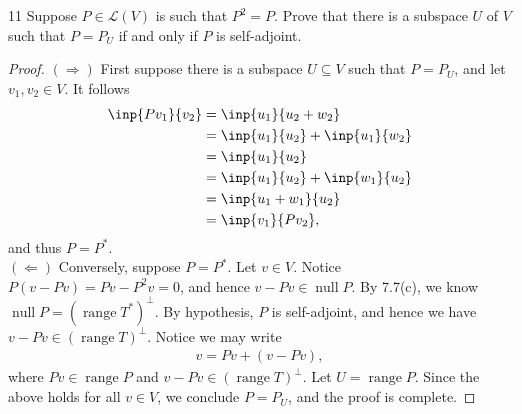 \documentclass{extarticle}
\newenvironment{problem}[1]{\begin{prob*}{#1}{}}{\end{prob*}}
\newcommand{\Hom}{\mathcal{L}}
\DeclareMathOperator{\Null}{null}
\DeclareMathOperator{\Range}{range}
\begin{document}
\begin{problem}{11}
Suppose $P\in\Hom(V)$ is such that $P^2 = P$.  Prove that there is a subspace $U$ of $V$ such that $P = P_U$ if and only if $P$ is self-adjoint.
\end{problem}
\begin{proof}
$(\Rightarrow)$ First suppose there is a subspace $U\subseteq V$ such that $P = P_U$, and let $v_1,v_2\in V$.  It follows
\begin{align*}
\inp{Pv_1}{v_2} &= \inp{u_1}{u_2 + w_2}\\
&= \inp{u_1}{u_2} + \inp{u_1}{w_2}\\
&= \inp{u_1}{u_2}\\
&= \inp{u_1}{u_2} + \inp{w_1}{u_2}\\
&= \inp{u_1 + w_1}{u_2}\\
&= \inp{v_1}{Pv_2},
\end{align*}
and thus $P = P^\ast$.\\
\indent $(\Leftarrow)$ Conversely, suppose $P = P^\ast$.  Let $v\in V$.  Notice $P(v - Pv)= Pv - P^2v = 0$, and hence $v - Pv\in\Null P$.  By 7.7(c), we know $\Null P = \left(\Range T^\ast\right)^\perp$.  By hypothesis, $P$ is self-adjoint, and hence we have $v-Pv \in \left(\Range T\right)^\perp$.  Notice we may write
\begin{align*}
v = Pv + (v - Pv),
\end{align*}
where $Pv \in \Range P$ and $v-Pv \in \left(\Range T\right)^\perp$.  Let $U = \Range P$.  Since the above holds for all $v\in V$, we conclude $P = P_U$, and the proof is complete.
\end{proof}
\end{document}
